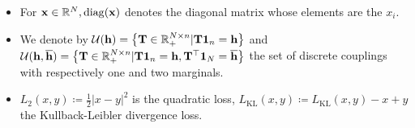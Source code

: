 \begin{itemize}
    \item For ${\mathbf{x}} \in \mathbb{R}^{N}, \operatorname{diag}({\mathbf{x}})$ denotes the diagonal matrix whose elements are the $x_i$.
    \item We denote by ${\mathcal{U}}({\mathbf{h}}) = \left\{ {\mathbf{T}} \in \mathbb{R}_+^{N \times n} | {\mathbf{T}} \bm{1}_n = {\mathbf{h}} \right\}$ and ${\mathcal{U}}({\mathbf{h}}, \overline{{\mathbf{h}}}) = \left\{ {\mathbf{T}} \in \mathbb{R}_+^{N \times n} | {\mathbf{T}} \bm{1}_n = {\mathbf{h}}, {\mathbf{T}}^\top \bm{1}_N = \overline{{\mathbf{h}}} \right\}$ the set of discrete couplings with respectively one and two marginals.
    \item $L_2(x,y) \coloneqq \frac{1}{2} |x - y|^2$ is the quadratic loss,  $L_{\mathrm{KL}}(x,y) \coloneqq L_{\mathrm{KL}}(x,y) - x + y $ the Kullback-Leibler divergence loss.
\end{itemize}